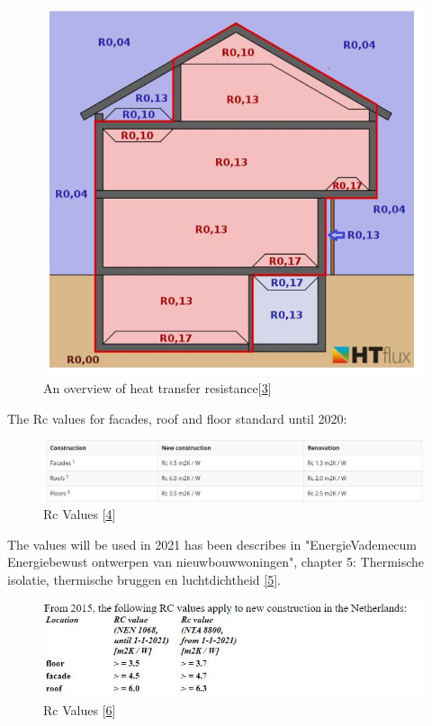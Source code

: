 \documentclass[a4paper,10pt]{article}
\begin{document}
\begin{figure}[H]
	\centering
	\includegraphics[width=0.8\columnwidth]{Pictures/Overview of heat resistances.JPG}
	\caption[Short title]{An overview of heat transfer resistance[\href{https://www.htflux.com/en/documentation/boundary-conditions/surface-resistance-heat-transfer-coefficient/}{3}]}
	\label{table 1}
	\end{figure}


The Rc values for facades, roof and floor standard until 2020:

\begin{figure}[H]
	\centering
	\includegraphics[width=1.2\columnwidth]{Pictures/Rc_values_2020.JPG}
	\caption[Short title]{Rc Values [\href{https://www.isolatiemateriaal.nl/kenniscentrum/het-bouwbesluit-over-isolatie-en-rc-waarde/}{4}]}
	\label{table 1}
	\end{figure}

The values will be used in 2021 has been describes in "EnergieVademecum Energiebewust ontwerpen van nieuwbouwwoningen", chapter 5: Thermische isolatie, thermische bruggen en luchtdichtheid
\href{https://v-1isso-1nl-1y6tawt2z0091.stcproxy.han.nl/q/9d67bdb7}{[5]}.

\begin{figure}[H]
	\centering
	\includegraphics[width=1.0\columnwidth]{Pictures/Rc_values_2021.JPG}
	\caption[Short title]{Rc Values [\href{https://www.joostdevree.nl/shtmls/r-waarde.shtml}{6}]}
	\label{table 1}
	\end{figure}
\end{document}
